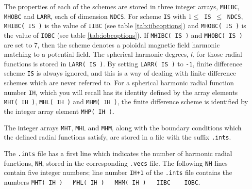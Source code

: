 The properties of each of the schemes are stored in
three integer arrays,
\verb.MHIBC., \verb.MHOBC. and \verb.LARR.,
each of dimension \verb.NDCS.. 
For scheme \verb+IS+ with 
$1 \leq $\verb+ IS +$ \leq $\verb. NDCS.,
\verb.MHIBC( IS ). is the value of \verb.IIBC.
(see table \ref{tab:iibcoptions}) and
\verb.MHOBC( IS ). is the value of \verb.IOBC.
(see table \ref{tab:iobcoptions}).
If \verb.MHIBC( IS ). and \verb.MHOBC( IS ). are
set to $7$, then the scheme denotes a poloidal
magnetic field harmonic matching to a potential
field. The spherical harmonic degrees, $l$,
for those radial functions is stored in \verb.LARR( IS )..
By setting \verb.LARR( IS ). to \verb.-1., finite
difference scheme \verb.IS. is always ignored, and
this is a way of dealing with finite difference schemes
which are never referred to.
For a spherical harmonic radial function number \verb+IH+,
which you will recall has its identity defined by the
array elements \verb+MHT( IH )+, \verb+MHL( IH )+ and
\verb+MHM( IH )+, the finite difference scheme is identified
by the integer array element \verb+MHP( IH )+.

The integer arrays \verb+MHT+, \verb+MHL+ and \verb+MHM+,
along with the boundary conditions which the defined
radial functions satisfy, are stored in a file with the
suffix \verb+.ints+.

The \verb+.ints+ file has a first
line which indicates the number of
harmonic radial functions, \verb+NH+,
stored in the corresponding
\verb+.vecs+ file.
The following \verb+NH+ lines contain five integer numbers;
line number \verb.IH+1. of the \verb+.ints+ file
contains the numbers
\verb+MHT( IH )   MHL( IH )   MHM( IH )   IIBC    IOBC+.


